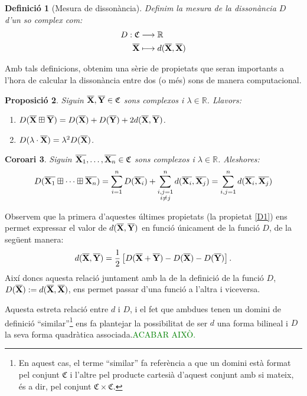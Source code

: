 \documentclass{article}
\theoremstyle{math}
\newtheorem{definition}{Definició}[section]
\newtheorem{prop}[definition]{Proposició}
\newtheorem{corollary}[definition]{Coro\lgem ari}
\newcommand{\0}{\ensuremath{\vb{0}}}
\newcommand{\X}{\ensuremath{\vb{X}}}
\newcommand{\Y}{\ensuremath{\vb{Y}}}
\newcommand{\RR}{\ensuremath{\mathbb{R}}} %
\begin{document}
\begin{definition}[Mesura de dissonància]
    Definim la \textit{mesura de la dissonància $D$ d'un so complex} com:
    \begin{align*}
        D:\mathfrak{C}&\longrightarrow\RR\\
        \overline{\X}&\longmapsto d(\overline{\X},\overline{\X})
    \end{align*}
\end{definition}
Amb tals definicions, obtenim una sèrie de propietats que seran importants a l'hora de calcular la dissonància entre dos (o més) sons de manera computacional.
\begin{prop}
    Siguin $\overline{\X},\overline{\Y}\in\mathfrak{C}$ sons complexos i $\lambda\in\RR$. Llavors:
    \begin{enumerate}[label=$D$\arabic*),ref=$D$\arabic*]
        \item\label{D1} $D(\overline{\X}\boxplus\overline{\Y})=D(\overline{\X})+D(\overline{\Y})+2d(\overline{\X},\overline{\Y})$.
        \item\label{D2} $D(\lambda\cdot \overline{\X})=\lambda^2D(\overline{\X})$.
    \end{enumerate}
\end{prop}
\begin{corollary}
    Siguin $\overline{\X_1},\ldots,\overline{\X_n}\in\mathfrak{C}$ sons complexos i $\lambda\in\RR$. Aleshores: $$D(\overline{\X_1}\boxplus\cdots\boxplus\overline{\X_n})=\sum_{i=1}^nD(\overline{\X_i})+\sum_{\substack{i,j=1\\i\ne j}}^nd(\overline{\X_i},\overline{\X_j})=\sum_{i,j=1}^nd(\overline{\X_i},\overline{\X_j})$$
\end{corollary}
Observem que la primera d'aquestes últimes propietats (la propietat \ref{D1}) ens permet expressar el valor de $d(\overline{\X},\overline{\Y})$ en funció únicament de la funció $D$, de la següent manera: $$d(\overline{\X},\overline{\Y})=\frac{1}{2}\left[D(\overline{\X}+\overline{\Y})-D(\overline{\X})-D(\overline{\Y})\right].$$
Així doncs aquesta relació juntament amb la de la definició de la funció $D$, $D(\overline{\X}):=d(\overline{\X},\overline{\X})$, ens permet passar d'una funció a l'altra i viceversa.\par 
Aquesta estreta relació entre $d$ i $D$, i el fet que ambdues tenen un domini de definició ``similar''\footnote{En aquest cas, el terme ``similar'' fa referència a que un domini està format pel conjunt $\mathfrak{C}$ i l'altre pel producte cartesià d'aquest conjunt amb si mateix, és a dir, pel conjunt $\mathfrak{C}\times\mathfrak{C}$.} ens fa plantejar la possibilitat de ser $d$ una forma bilineal i $D$ la seva forma quadràtica associada.\textcolor{green}{ACABAR AIXÒ.}
\end{document}
